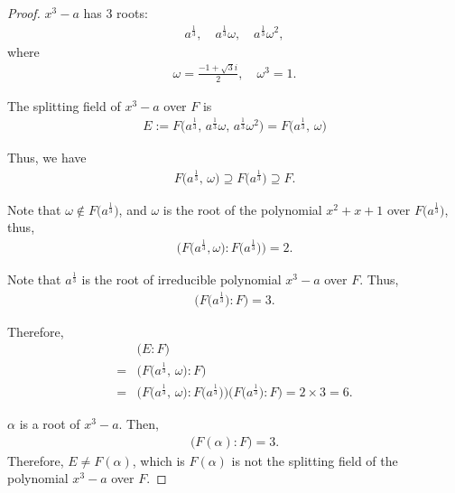 \documentclass[utf8]{ctexbook}
\begin{document}
\begin{proof}
$x^3 - a$ has $3$ roots:
\begin{align*}
a^{\frac{1}{3}}, \quad a^{\frac{1}{3}}\omega, \quad a^{\frac{1}{3}} \omega^2, 
\end{align*}
where
\begin{align*}
\omega = \frac{-1 + \sqrt{3} i }{2}, \quad \omega^3 = 1.
\end{align*}

The splitting field of $x^3 - a$ over $F$ is
\begin{align*}
E := F\big(  a^{\frac{1}{3}}, \, a^{\frac{1}{3}}\omega, \, a^{\frac{1}{3}} \omega^2 \big) = F \big( a^{\frac{1}{3}} , \,   \omega \big)
\end{align*}

Thus, we have
\begin{align*}
 F \big( a^{\frac{1}{3}} , \,   \omega \big) \supseteq  F \big( a^{\frac{1}{3}} \big) \supseteq F .
\end{align*}

Note that $\omega \not \in  F \big( a^{\frac{1}{3}} \big) $, and $\omega $ is the root of the polynomial $x^2 + x + 1$ over $F \big( a^{\frac{1}{3}} \big) $, thus,
\begin{align*}
\big( F \big( a^{\frac{1}{3}}, \omega \big) : F \big( a^{\frac{1}{3}} \big)  \big) = 2 .
\end{align*} 

Note that $a^{\frac{1}{3}}$ is the root of irreducible polynomial $x^3 - a$ over $F$. Thus,
\begin{align*}
\big( F \big( a^{\frac{1}{3}} \big) : F \big) = 3 .
\end{align*}

Therefore,
\begin{align*}
& \big( E : F \big) \\
=& \big( F \big( a^{\frac{1}{3}} , \,   \omega \big) : F\big) \\
=& \big( F \big( a^{\frac{1}{3}} , \,   \omega \big) : F \big( a^{\frac{1}{3}} \big)  \big) \big( F\big(  a^{\frac{1}{3}} \big)  : F\big) = 2 \times 3 = 6 .
\end{align*}

$\alpha$ is a root of $x^3 - a$. Then,
\begin{align*}
\big(F(\alpha) : F  \big) = 3 .
\end{align*}
Therefore, $E \neq F(\alpha)$, which is $F(\alpha)$ is not the splitting field of the polynomial $x^3 - a$ over $F$.

\end{proof}
\end{document}
